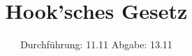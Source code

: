 

\subject{vProbe}
\title{Hook'sches Gesetz}
\date{%
  Durchführung: 11.11
  \hspace{3em}
  Abgabe: 13.11
}



\maketitle
\thispagestyle{empty}
\tableofcontents
\newpage






\printbibliography{}

